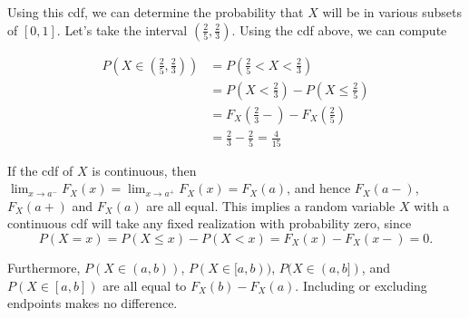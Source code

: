 Using this cdf, we can determine the probability that $X$ will be in various subsets of $[0,1]$. Let's take the interval $(\frac{2}{5},\frac{2}{3})$. Using the cdf above, we can compute

\begin{center}
    \begin{minipage}{0.5\textwidth}
        \centering
        $$\begin{aligned}P(X \in (\textstyle\frac{2}{5},\frac{2}{3})) &= P(\textstyle\frac{2}{5} < X < \frac{2}{3}) \\
&= P(X < \textstyle\frac{2}{3}) - P(X \leq \frac{2}{5}) \\
&= F_X(\textstyle\frac{2}{3} - ) - F_X(\frac{2}{5}) \\
&= \textstyle \frac{2}{3} - \frac{2}{5} = \frac{4}{15}\end{aligned}$$
\vspace{0.25em}
    \end{minipage}%
    \begin{minipage}{0.5\textwidth}
        \centering
\end{minipage}
\end{center}


\begin{keypoint}
If the cdf of $X$ is continuous, then $\lim_{x \to a^{-}}F_X(x) = \lim_{x \to a^{+}}F_X(x) = F_X(a)$, and hence $F_X(a-)$, $F_X(a+)$ and $F_X(a)$ are all equal. This implies a random variable $X$ with a continuous cdf will take any fixed realization with probability zero, since
$$P(X = x) = P(X \leq x) - P(X < x) = F_X(x) - F_X(x-) = 0.$$

Furthermore, $P(X \in (a,b))$, $P(X \in [a,b))$, $P(X \in (a,b])$, and $P(X \in [a,b])$ are all equal to $F_X(b) - F_X(a)$. Including or excluding endpoints makes no difference.
\end{keypoint}

